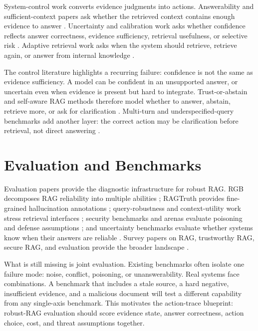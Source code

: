 System-control work converts evidence judgments into actions. Answerability and sufficient-context papers ask whether the retrieved context contains enough evidence to answer \cite{sufficientContext2024,rrag111,rrag141,rrag193}. Uncertainty and calibration work asks whether confidence reflects answer correctness, evidence sufficiency, retrieval usefulness, or selective risk \cite{calibRAG2025,uncertaintyRAG2024,rrag001,rrag007,rrag012}. Adaptive retrieval work asks when the system should retrieve, retrieve again, or answer from internal knowledge \cite{selfRAG2023,whenToRetrieve2024,crag2024,ctrla2025,rrag034}.

The control literature highlights a recurring failure: confidence is not the same as evidence sufficiency. A model can be confident in an unsupported answer, or uncertain even when evidence is present but hard to integrate. Trust-or-abstain and self-aware RAG methods therefore model whether to answer, abstain, retrieve more, or ask for clarification \cite{rrag002,rrag006,rrag041,rrag064,rrag066}. Multi-turn and underspecified-query benchmarks add another layer: the correct action may be clarification before retrieval, not direct answering \cite{rrag141,rrag146,rrag153}.

\section{Evaluation and Benchmarks}

Evaluation papers provide the diagnostic infrastructure for robust RAG. RGB decomposes RAG reliability into multiple abilities \cite{rgb2023}; RAGTruth provides fine-grained hallucination annotations \cite{ragTruth2024}; query-robustness and context-utility work stress retrieval interfaces \cite{queryRobustness2025,rrag058}; security benchmarks and arenas evaluate poisoning and defense assumptions \cite{rrag019,rrag023,rrag035}; and uncertainty benchmarks evaluate whether systems know when their answers are reliable \cite{rrag001,rrag093}. Survey papers on RAG, trustworthy RAG, secure RAG, and evaluation provide the broader landscape \cite{ragSurvey2024,ragComprehensive2025,ragEvaluationSurvey2024,trustRAGCompass2024,trustworthyRAGSurvey2025}.

What is still missing is joint evaluation. Existing benchmarks often isolate one failure mode: noise, conflict, poisoning, or unanswerability. Real systems face combinations. A benchmark that includes a stale source, a hard negative, insufficient evidence, and a malicious document will test a different capability from any single-axis benchmark. This motivates the action-trace blueprint: robust-RAG evaluation should score evidence state, answer correctness, action choice, cost, and threat assumptions together.
